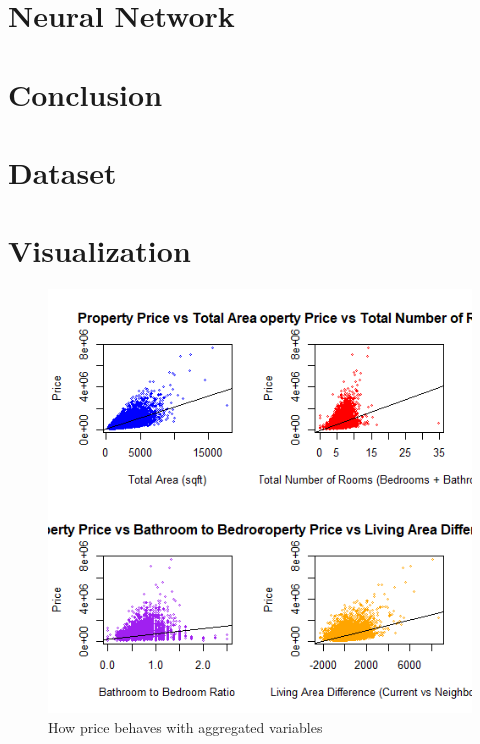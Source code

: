 \documentclass[a4paper, 9pt]{article}
\begin{document}
\begin{multicols}{2}
\section{Neural Network} \vspace{-7pt}

\section{Conclusion} \vspace{-7pt}
\noindent

\end{multicols}


\pagebreak
\appendix

\section{Dataset}



\section{Visualization}
\begin{figure}[h]
\includegraphics[scale=0.6]{corrplots}
\centering
\caption{How price behaves with aggregated variables}
\end{figure}
\end{document}
